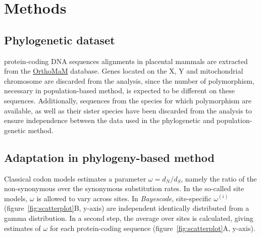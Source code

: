 \documentclass{article}
\newcommand{\dn}{d_N}
\newcommand{\ds}{d_S}
\newcommand{\dnds}{\dn / \ds}
\begin{document}
    \section*{Methods}\label{sec:methods}

    \subsection*{Phylogenetic dataset}
    protein-coding DNA sequences alignments in placental mammals are extracted from the \href{https://www.orthomam.univ-montp2.fr}{OrthoMaM} database\cite{ranwez_orthomam_2007, douzery_orthomam_2014, scornavacca_orthomam_2019}.
    Genes located on the X, Y and mitochondrial chromosome are discarded from the analysis, since the number of polymorphism, necessary in population-based method, is expected to be different on these sequences.
    Additionally, sequences from the species for which polymorphism are available, as well as their sister species have been discarded from the analysis to ensure independence between the data used in the phylogenetic and population-genetic method.

    \subsection*{Adaptation in phylogeny-based method}
    Classical codon models estimates a parameter $\omega=\dnds$, namely the ratio of the non-synonymous over the synonymous substitution rates\cite{muse_likelihood_1994,goldman_codonbased_1994}.
    In the so-called site models, $\omega$ is allowed to vary across sites\cite{yang_codonsubstitution_2000, huelsenbeck_dirichlet_2006}.
    In \textit{Bayescode}, site-specific $\omega^{(i)}$ (figure~\ref{fig:scatterplot}B, y-axis) are independent identically distributed from a gamma distribution\cite{lartillot_phylobayes_2013}.
    In a second step, the average over sites is calculated, giving estimates of $\omega$ for each protein-coding sequence (figure~\ref{fig:scatterplot}A, y-axis).
\end{document}
